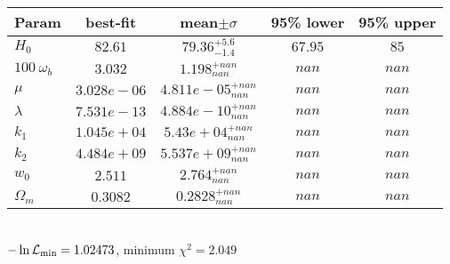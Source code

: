 \begin{tabular}{|l|c|c|c|c|} 
 \hline 
Param & best-fit & mean$\pm\sigma$ & 95\% lower & 95\% upper \\ \hline 
$H_{0 }$ &$82.61$ & $79.36_{-1.4}^{+5.6}$ & $67.95$ & $85$ \\ 
$100~\omega_{b }$ &$3.032$ & $1.198_{nan}^{+nan}$ & $nan$ & $nan$ \\ 
$\mu$ &$3.028e-06$ & $4.811e-05_{nan}^{+nan}$ & $nan$ & $nan$ \\ 
$\lambda$ &$7.531e-13$ & $4.884e-10_{nan}^{+nan}$ & $nan$ & $nan$ \\ 
$k_{1 }$ &$1.045e+04$ & $5.43e+04_{nan}^{+nan}$ & $nan$ & $nan$ \\ 
$k_{2 }$ &$4.484e+09$ & $5.537e+09_{nan}^{+nan}$ & $nan$ & $nan$ \\ 
$w_{0 }$ &$2.511$ & $2.764_{nan}^{+nan}$ & $nan$ & $nan$ \\ 
$\Omega_{m }$ &$0.3082$ & $0.2828_{nan}^{+nan}$ & $nan$ & $nan$ \\ 
\hline 
 \end{tabular} \\ 
$-\ln{\cal L}_\mathrm{min} =1.02473$, minimum $\chi^2=2.049$ \\ 
